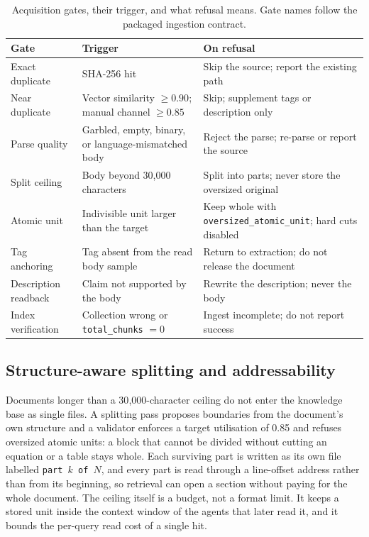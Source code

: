 \begin{table}[t]
\centering
\caption{Acquisition gates, their trigger, and what refusal means. Gate
names follow the packaged ingestion contract.}
\label{tab:acq-gates}
\small
\begin{tabular}{@{}llp{5.5cm}@{}}
\toprule
\textbf{Gate} & \textbf{Trigger} & \textbf{On refusal} \\
\midrule
Exact duplicate & SHA-256 hit & Skip the source; report the existing path \\
Near duplicate & Vector similarity $\geq 0.90$; manual channel $\geq 0.85$ & Skip; supplement tags or description only \\
Parse quality & Garbled, empty, binary, or language-mismatched body & Reject the parse; re-parse or report the source \\
Split ceiling & Body beyond 30{,}000 characters & Split into parts; never store the oversized original \\
Atomic unit & Indivisible unit larger than the target & Keep whole with \texttt{oversized\_atomic\_unit}; hard cuts disabled \\
Tag anchoring & Tag absent from the read body sample & Return to extraction; do not release the document \\
Description readback & Claim not supported by the body & Rewrite the description; never the body \\
\midrule
Index verification & Collection wrong or \texttt{total\_chunks} $= 0$ & Ingest incomplete; do not report success \\
\bottomrule
\end{tabular}
\end{table}

\subsection{Structure-aware splitting and addressability}

Documents longer than a 30{,}000-character ceiling do not enter the
knowledge base as single files. A splitting pass proposes boundaries
from the document's own structure and a validator enforces a target
utilisation of 0.85 and refuses oversized atomic units: a block that
cannot be divided without cutting an equation or a table stays whole.
Each surviving part is written as its own file labelled
\texttt{part $k$ of $N$}, and every part is read through a line-offset
address rather than from its beginning, so retrieval can open a section
without paying for the whole document. The ceiling itself is a budget,
not a format limit. It keeps a stored unit inside the context window of
the agents that later read it, and it bounds the per-query read cost of
a single hit.

